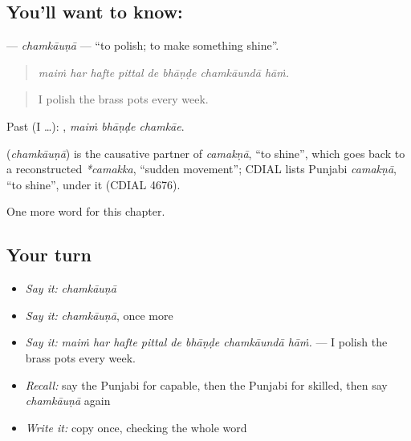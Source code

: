 \subsection*{You'll want to know: }
\textbf{} — \emph{chamkāuṇā} — \textquotedblleft{}to polish; to make something shine\textquotedblright{}.

\begin{quote}
       
\end{quote}

\begin{quote}
\emph{maiṁ har hafte pittal de bhāṇḍe chamkāundā hāṁ.}
\end{quote}

\begin{quote}
I polish the brass pots every week.
\end{quote}

Past (I …):   , \emph{maiṁ bhāṇḍe chamkāe}.

\begin{cousinweb}
\textbf{} (\emph{chamkāuṇā}) is the causative partner of \emph{camakṇā}, \textquotedblleft{}to shine\textquotedblright{}, which goes back to a reconstructed \emph{*camakka}, \textquotedblleft{}sudden movement\textquotedblright{}; CDIAL lists Punjabi \emph{camakṇā}, \textquotedblleft{}to shine\textquotedblright{}, under it (CDIAL 4676).
\end{cousinweb}

\begin{grammarlens}[title={What you've built}]
One more word for this chapter.
\end{grammarlens}

\subsection*{Your turn}
\begin{itemize}
\raggedright
  \item \emph{Say it:} \emph{chamkāuṇā}
  \item \emph{Say it:} \emph{chamkāuṇā}, once more
  \item \emph{Say it:} \emph{maiṁ har hafte pittal de bhāṇḍe chamkāundā hāṁ.} — I polish the brass pots every week.
  \item \emph{Recall:} say the Punjabi for capable, then the Punjabi for skilled, then say \emph{chamkāuṇā} again
  \item \emph{Write it:} copy \textbf{} once, checking the whole word
\end{itemize}

